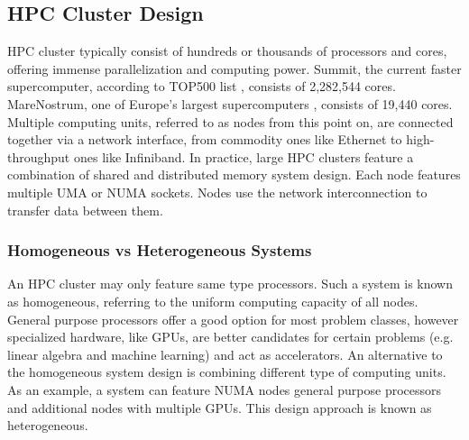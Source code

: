 \subsection{HPC Cluster Design}
\label{sec:cluster_design}

HPC cluster typically consist of hundreds or thousands of processors and cores, offering
immense parallelization and computing power.  Summit, the current faster supercomputer,
according to TOP500 list \cite{TOP500}, consists of 2,282,544 cores.  MareNostrum, one of
Europe's largest supercomputers \cite{TOP500}, consists of 19,440 cores.  Multiple
computing units, referred to as nodes from this point on, are connected together via a
network interface, from commodity ones like Ethernet to high-throughput ones like
Infiniband.  In practice, large HPC clusters feature a combination of shared and
distributed memory system design. Each node features multiple UMA or NUMA sockets.  Nodes
use the network interconnection to transfer data between them. 

\subsubsection{Homogeneous vs Heterogeneous Systems}
\label{sec:cluster_homogeneity}
An HPC cluster may only feature same type processors.  Such a system is known as
homogeneous, referring to the uniform computing capacity of all nodes.  General purpose
processors offer a good option for most problem classes, however specialized hardware,
like GPUs, are better candidates for certain problems (e.g. linear algebra and machine
learning) and act as accelerators.  An alternative to the homogeneous system design is
combining different type of computing units.  As an example, a system can feature NUMA
nodes general purpose processors and additional nodes with multiple GPUs.  This design
approach is known as heterogeneous.

